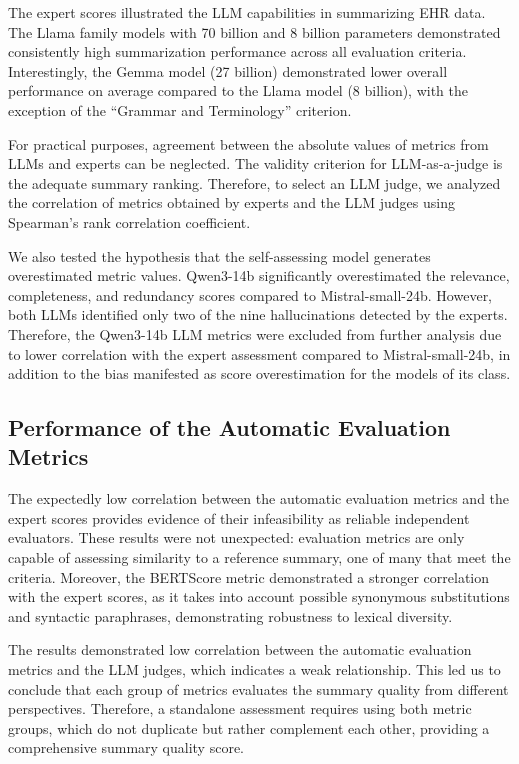 \documentclass[runningheads]{llncs}
\begin{document}
The expert scores illustrated the LLM capabilities in summarizing EHR data. The Llama family models with 70 billion and 8 billion parameters demonstrated consistently high summarization performance across all evaluation criteria. Interestingly, the Gemma model (27 billion) demonstrated lower overall performance on average compared to the Llama model (8 billion), with the exception of the ``Grammar and Terminology'' criterion.

For practical purposes, agreement between the absolute values of metrics from LLMs and experts can be neglected. The validity criterion for LLM-as-a-judge is the adequate summary ranking. Therefore, to select an LLM judge, we analyzed the correlation of metrics obtained by experts and the LLM judges using Spearman's rank correlation coefficient.

We also tested the hypothesis that the self-assessing model generates overestimated metric values. Qwen3-14b significantly overestimated the relevance, completeness, and redundancy scores compared to Mistral-small-24b. However, both LLMs identified only two of the nine hallucinations detected by the experts. Therefore, the Qwen3-14b LLM metrics were excluded from further analysis due to lower correlation with the expert assessment compared to Mistral-small-24b, in addition to the bias manifested as score overestimation for the models of its class.

\subsection{Performance of the Automatic Evaluation Metrics}\label{subsec:autometrics}

The expectedly low correlation between the automatic evaluation metrics and the expert scores provides evidence of their infeasibility as reliable independent evaluators. These results were not unexpected: evaluation metrics are only capable of assessing similarity to a reference summary, one of many that meet the criteria. Moreover, the BERTScore metric demonstrated a stronger correlation with the expert scores, as it takes into account possible synonymous substitutions and syntactic paraphrases, demonstrating robustness to lexical diversity.

The results demonstrated low correlation between the automatic evaluation metrics and the LLM judges, which indicates a weak relationship. This led us to conclude that each group of metrics evaluates the summary quality from different perspectives. Therefore, a standalone assessment requires using both metric groups, which do not duplicate but rather complement each other, providing a comprehensive summary quality score.
\end{document}
